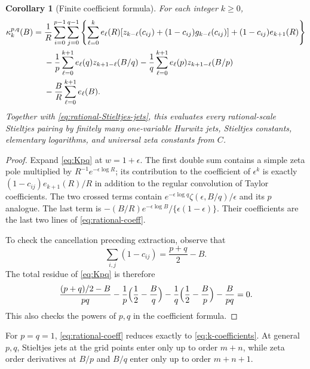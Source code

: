 \documentclass[11pt,a4paper]{article}
\newtheorem{corollary}[theorem]{Corollary}
\theoremstyle{definition}
\numberwithin{equation}{section}
\begin{document}
\begin{corollary}[Finite coefficient formula]\label{thm:rational-coeff}
For each integer $k\ge0$,
\begin{align}
 \kappa_k^{p,q}(B)={}&\frac1R\sum_{i=0}^{p-1}\sum_{j=0}^{q-1}
  \left\{\sum_{\ell=0}^{k}e_\ell(R)
       [z_{k-\ell}(c_{ij})+(1-c_{ij})g_{k-\ell}(c_{ij})]
      +(1-c_{ij})e_{k+1}(R)\right\}\notag\\
 &-\frac1p\sum_{\ell=0}^{k+1}e_\ell(q)z_{k+1-\ell}(B/q)
  -\frac1q\sum_{\ell=0}^{k+1}e_\ell(p)z_{k+1-\ell}(B/p)\notag\\
 &-\frac BR\sum_{\ell=0}^{k+1}e_\ell(B).
                                  \label{eq:rational-coeff}
\end{align}
Together with \eqref{eq:rational-Stieltjes-jets}, this evaluates every
rational-scale Stieltjes pairing by finitely many one-variable Hurwitz
jets, Stieltjes constants, elementary logarithms, and universal zeta
constants from $C$.
\end{corollary}
\begin{proof}
Expand \eqref{eq:Kpq} at $w=1+\epsilon$.
The first double sum contains a simple zeta pole multiplied by
$R^{-1}e^{-\epsilon\log R}$; its contribution to the coefficient of
$\epsilon^k$ is exactly $(1-c_{ij})e_{k+1}(R)/R$ in addition to the
regular convolution of Taylor coefficients. The two crossed terms
contain $e^{-\epsilon\log q}\zeta(\epsilon,B/q)/\epsilon$ and its
$p$ analogue. The last term is
$-(B/R)e^{-\epsilon\log B}/\{\epsilon(1-\epsilon)\}$.
Their coefficients are the last two lines of \eqref{eq:rational-coeff}.

To check the cancellation preceding extraction, observe that
\[
 \sum_{i,j}(1-c_{ij})=\frac{p+q}{2}-B.
\]
The total residue of \eqref{eq:Kpq} is therefore
\[
 \frac{(p+q)/2-B}{pq}
 -\frac1p\Bigl(\frac12-\frac Bq\Bigr)
 -\frac1q\Bigl(\frac12-\frac Bp\Bigr)-\frac B{pq}=0.
\]
This also checks the powers of $p,q$ in the coefficient formula.
\end{proof}

For $p=q=1$, \eqref{eq:rational-coeff} reduces exactly to
\eqref{eq:k-coefficients}. At general $p,q$, Stieltjes jets at the grid
points enter only up to order $m+n$, while zeta order derivatives at
$B/p$ and $B/q$ enter only up to order $m+n+1$.
\end{document}
